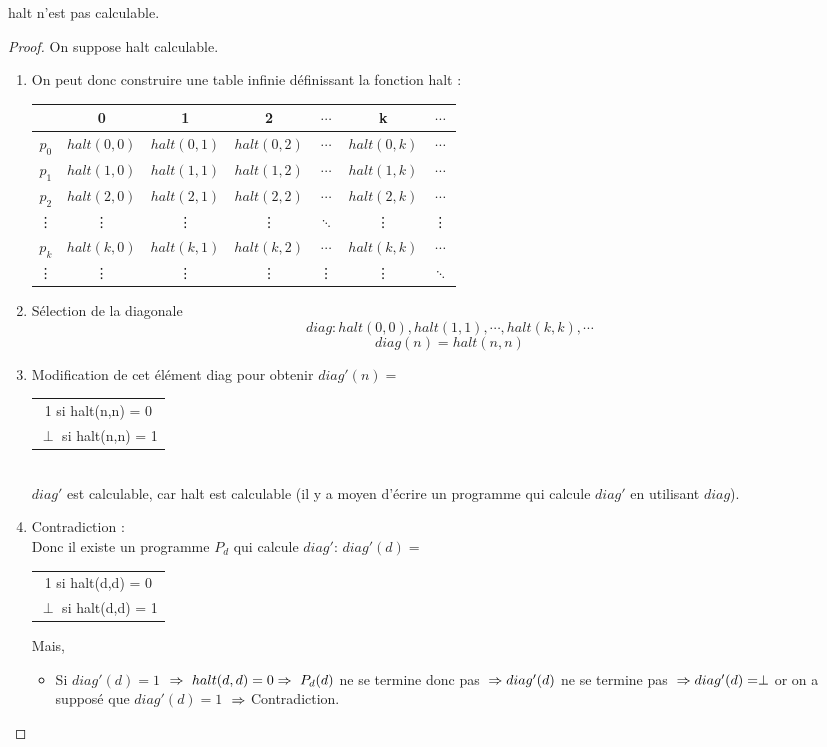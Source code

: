 \begin{mytheo}[halt]
	halt n'est pas calculable.
	\begin{proof}
	On suppose halt calculable.
	\begin{enumerate}
		\item On peut donc construire une table infinie définissant la fonction
			halt : \\
			\begin{tabular}{|c||c|c|c|c|c|c|}
				\hline
				& 0 & 1 & 2 & $\cdots$ & k & $\cdots$ \\
				\hline
				$p_0$ & $halt(0,0)$ & $halt(0,1)$ & $halt(0,2)$ & $\cdots$ & $halt(0,k)$ & $\cdots$ \\
				$p_1$ & $halt(1,0)$ & $halt(1,1)$ & $halt(1,2)$ & $\cdots$ & $halt(1,k)$ & $\cdots$ \\
				$p_2$ & $halt(2,0)$ & $halt(2,1)$ & $halt(2,2)$ & $\cdots$ & $halt(2,k)$ & $\cdots$ \\
				\vdots & {\vdots} &{\vdots}& {\vdots} & $\ddots$ & {\vdots} &{\vdots}\\
				$p_k$ & $halt(k,0)$ & $halt(k,1)$ & $halt(k,2)$ & $\cdots$ & $halt(k,k)$ & $\cdots$ \\
				\vdots & {\vdots} &{\vdots}& {\vdots} & {\vdots} & {\vdots} &$\ddots$\\
				\hline
			\end{tabular}
		\item Sélection de la diagonale
			\[ diag :halt(0,0),halt(1,1),\cdots ,halt(k,k), \cdots \]
			\[diag(n) = halt(n,n)\]
		\item Modification de cet élément diag pour obtenir
			$diag'(n) =$
			\begin{tabular}{c}
				1 si halt(n,n) = 0\\
				$\perp$ si halt(n,n) = 1\\
			\end{tabular}\\
			$diag'$ est calculable, car halt est calculable (il y a moyen
			d'écrire un programme qui calcule $diag'$ en utilisant $diag$).
		\item Contradiction :\\
		       	Donc il existe un programme $P_d$ qui calcule
			$diag'$:
			$diag'(d) =$
			\begin{tabular}{c}
				1 si halt(d,d) = 0\\
				$\perp$ si halt(d,d) = 1\\
			\end{tabular}
			Mais,
			\begin{itemize}
				\item Si $diag'(d)= 1$ $\\
				\Rightarrow \  halt(d,d) = 0 \\
				\Rightarrow \ P_d(d)$ ne se termine donc pas $ \\
				\Rightarrow diag'(d)$ ne se termine pas $ \\
				\Rightarrow diag'(d) = \perp$ or on a supposé que $diag'(d) = 1$ $ \\
				\Rightarrow $
				Contradiction.


\end{itemize}
\end{enumerate}
\end{proof}
\end{mytheo}
